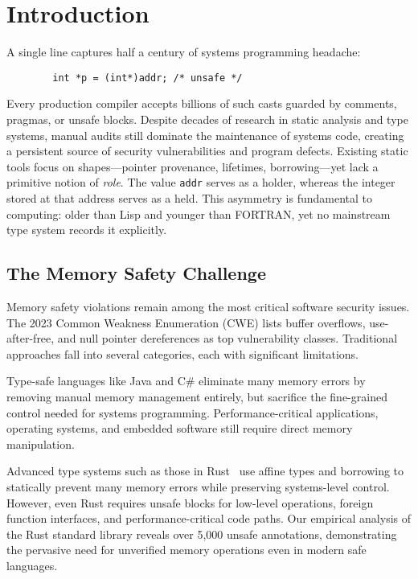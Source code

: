 \documentclass[acmsmall,anonymous,review,screen]{acmart}
\begin{document}
	
	\maketitle
	
	\section{Introduction}
	
	A single line captures half a century of systems programming headache:
	
	\begin{verbatim}
		int *p = (int*)addr; /* unsafe */
	\end{verbatim}
	
	Every production compiler accepts billions of such casts guarded by comments, pragmas, or unsafe blocks. Despite decades of research in static analysis and type systems, manual audits still dominate the maintenance of systems code, creating a persistent source of security vulnerabilities and program defects. Existing static tools focus on shapes—pointer provenance, lifetimes, borrowing—yet lack a primitive notion of \emph{role}. The value \texttt{addr} serves as a holder, whereas the integer stored at that address serves as a held. This asymmetry is fundamental to computing: older than Lisp and younger than FORTRAN, yet no mainstream type system records it explicitly.
	
	\subsection{The Memory Safety Challenge}
	
	Memory safety violations remain among the most critical software security issues. The 2023 Common Weakness Enumeration (CWE) lists buffer overflows, use-after-free, and null pointer dereferences as top vulnerability classes. Traditional approaches fall into several categories, each with significant limitations.
	
	Type-safe languages like Java and C\# eliminate many memory errors by removing manual memory management entirely, but sacrifice the fine-grained control needed for systems programming. Performance-critical applications, operating systems, and embedded software still require direct memory manipulation.
	
	Advanced type systems such as those in Rust~\cite{matsakis2014rust} use affine types and borrowing to statically prevent many memory errors while preserving systems-level control. However, even Rust requires unsafe blocks for low-level operations, foreign function interfaces, and performance-critical code paths. Our empirical analysis of the Rust standard library reveals over 5,000 unsafe annotations, demonstrating the pervasive need for unverified memory operations even in modern safe languages.
	
\end{document}
